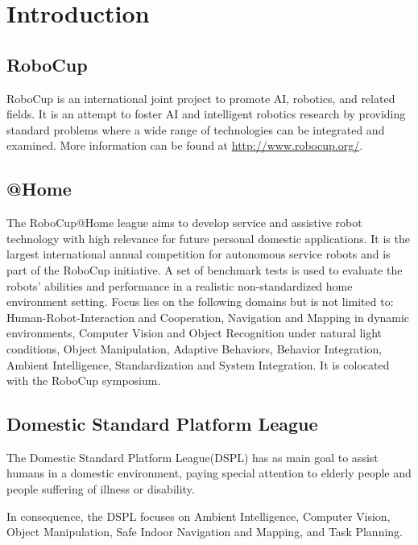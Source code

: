 \documentclass{article}
\begin{document}
\clearpage
{}
\tableofcontents{}
\singlespacing
\clearpage

\section{Introduction}

\subsection{RoboCup}
RoboCup is an international joint project to promote AI, robotics, and related fields. It is an attempt to foster AI and intelligent robotics research by providing standard problems where a wide range of technologies can be integrated and examined. More information can be found at {\small\url{http://www.robocup.org/}}.

\subsection{@Home}
The RoboCup@Home league aims to develop service and assistive robot technology with high relevance for future personal domestic applications. It is the largest international annual competition for autonomous service robots and is part of the RoboCup initiative. A set of benchmark tests is used to evaluate the robots' abilities and performance in a realistic non-standardized home environment setting. Focus lies on the following domains but is not limited to: Human-Robot-Interaction and Cooperation, Navigation and Mapping in dynamic environments, Computer Vision and Object Recognition under natural light conditions, Object Manipulation, Adaptive Behaviors, Behavior Integration, Ambient Intelligence, Standardization and System Integration. It is colocated with the RoboCup symposium.

\subsection{Domestic Standard Platform League}
The Domestic Standard Platform League(DSPL) has as main goal to assist humans in a domestic environment, paying special attention to elderly people and people suffering of illness or disability.

In consequence, the DSPL focuses on Ambient Intelligence, Computer Vision, Object Manipulation, Safe Indoor Navigation and Mapping, and Task Planning.


\end{document}
